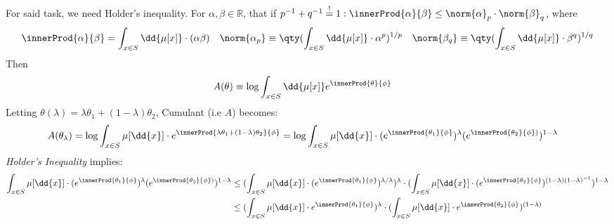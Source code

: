 For said task, 
we need Holder's inequality.
For 
$\alpha, \beta 
\in \mathbb{R}$,
that if 
$p^{-1} + q^{-1}  
\overset{!}{=} 1: 
    \innerProd 
    {\alpha} {\beta} 
\leq 
    \norm {\alpha} _{p}
    \cdot 
    \norm {\beta} _{q}
$, where
$$
    \innerProd
    {\alpha}
    {\beta}
=
    \int _{x\in S}
    \dd{\mu[x]}
    \cdot 
    (
    \alpha 
    \beta )
\quad 
    \norm{\alpha _{p}}
\equiv 
    \qty(
        \int _{x\in S}
        \dd{\mu[x]}
        \cdot 
        \alpha ^{p}
    )^{1/p}
\quad 
    \norm{\beta _{q}}
\equiv
    \qty(
        \int _{x\in S}
        \dd{\mu[x]}
        \cdot 
        \beta ^{q}
    )^{1/q}
$$
Then 
\begin{align*}
    A (\theta) 
& \equiv 
    \log 
    \int _{x \in S}
    \dd{\mu [x]}
    e^
    { \innerProd
      {\theta} {\phi}}  
\end{align*} 
Letting 
$  \theta (\lambda) 
= 
   \lambda \theta_{1} 
   + (1 - \lambda) \theta_{2} $,
Cumulant (i.e $A$) 
becomes: 
\begin{align*}
    A (\theta _{\lambda}) 
& =
    \log \int _{x\in S} 
    \mu[ \dd{x} ] 
\cdot 
    e^{
        \innerProd
        { \lambda \theta_{1} 
          + (1 - \lambda) \theta_{2}
        }
        {\phi}
    } 
=
    \log \int _{x\in S} 
    \mu[ \dd{x} ] 
\cdot
    ( e^{
            \innerProd
            { \theta_{1} }
            {\phi} } ) 
    ^{\lambda} 
    ( e^{
        \innerProd
        { \theta_{2} }
        {\phi} ) } 
    ) 
    ^{1 - \lambda} 
\end{align*}
{\it Holder's Inequality} implies: 
\begin{align*}
        \int _{x\in S} 
        \mu[ \dd{x} ] 
    \cdot
        ( e^{
                \innerProd
                { \theta_{1} }
                {\phi} } ) 
        ^{\lambda} 
        ( e^{
            \innerProd
            { \theta_{2} }
            {\phi} ) } 
        ) 
        ^{1 - \lambda} 
& \leq 
( 
        \int _{x\in S} \mu[ \dd{x} ] 
        \cdot
    (
        e^ 
        { \innerProd
        { \theta_{1} } {\phi}  
        }
    )  
    ^{\lambda / \lambda}
) 
^{\lambda} 
\cdot 
( 
        \int _{x\in S} \mu[ \dd{x} ] 
        \cdot
    (
        e^ 
        {  \innerProd
           { \theta_{2} } {\phi}  
        }
    )  
    ^{ (1 - \lambda ) 
       ( 1 - \lambda)^{-1}
     }
) 
^{1 - \lambda} 
\\ 
& \leq 
( 
        \int _{x\in S} \mu[ \dd{x} ] 
        \cdot
        e^ 
        { \innerProd
        { \theta_{1} } {\phi}  
        }
)  
^{\lambda} 
\cdot 
( 
        \int _{x\in S} \mu[ \dd{x} ] 
        \cdot
        e^ 
        {  \innerProd
           { \theta_{2} } {\phi}  
        }
) 
^{(1 - \lambda)} 
\end{align*}
